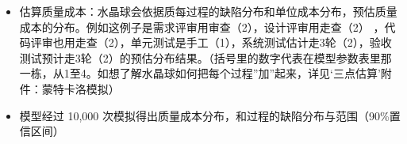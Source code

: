 \begin{itemize}
\tightlist
\item
  估算质量成本：水晶球会依据质每过程的缺陷分布和单位成本分布，预估质量成本的分布。例如这例子是需求评审用审查（2），设计评审用走查（2） ，代码评审也用走查（2），单元测试是手工（1），系统测试估计走3轮（2），验收测试预计走3轮（2）的预估分布结果。（括号里的数字代表在模型参数表里那一栋，从1至4。如想了解水晶球如何把每个过程”加”起来，详见‘三点估算’附件：蒙特卡洛模拟）
\end{itemize}

\begin{itemize}
\tightlist
\item
  模型经过 10,000 次模拟得出质量成本分布，和过程的缺陷分布与范围（90\%置信区间）
\end{itemize}

